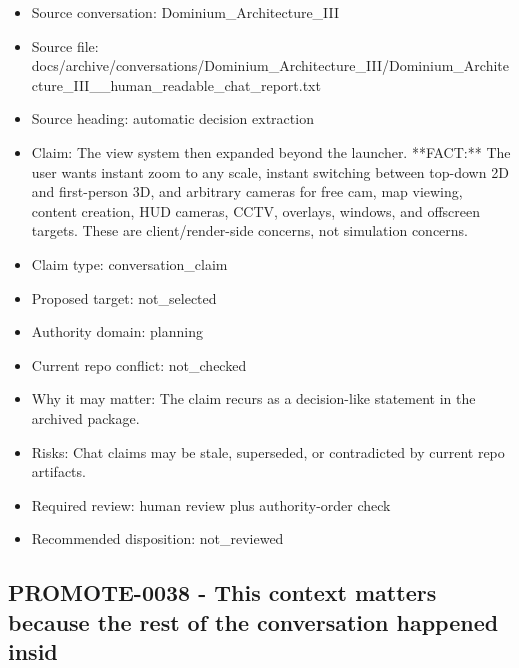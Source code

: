 \documentclass[11pt,a4paper]{report}
\begin{document}
\begin{itemize}
\item Source conversation: Dominium\_Architecture\_III
\item Source file: docs/archive/conversations/Dominium\_Architecture\_III/Dominium\_Architecture\_III\_\_human\_readable\_chat\_report.txt
\item Source heading: automatic decision extraction
\item Claim: The view system then expanded beyond the launcher. **FACT:** The user wants instant zoom to any scale, instant switching between top-down 2D and first-person 3D, and arbitrary cameras for free cam, map viewing, content creation, HUD cameras, CCTV, overlays, windows, and offscreen targets. These are client/render-side concerns, not simulation concerns.
\item Claim type: conversation\_claim
\item Proposed target: not\_selected
\item Authority domain: planning
\item Current repo conflict: not\_checked
\item Why it may matter: The claim recurs as a decision-like statement in the archived package.
\item Risks: Chat claims may be stale, superseded, or contradicted by current repo artifacts.
\item Required review: human review plus authority-order check
\item Recommended disposition: not\_reviewed
\end{itemize}

\subsection{PROMOTE-0038 - This context matters because the rest of the conversation happened insid}
\end{document}
